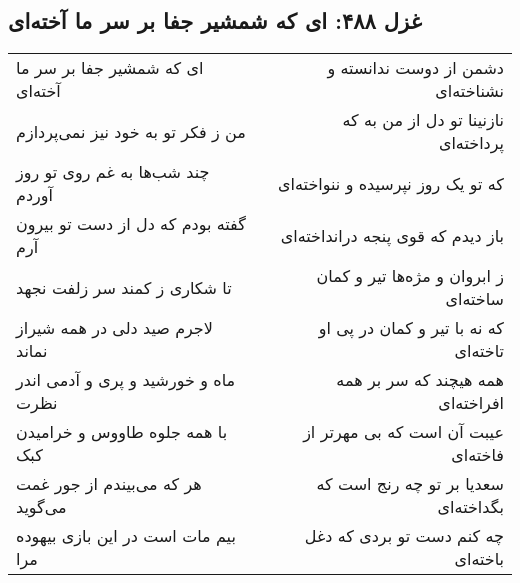 \begin{center}
\section*{غزل ۴۸۸: ای که شمشیر جفا بر سر ما آخته‌ای}
\label{sec:488}
\begin{longtable}{l p{0.5cm} r}
ای که شمشیر جفا بر سر ما آخته‌ای
&&
دشمن از دوست ندانسته و نشناخته‌ای
\\
من ز فکر تو به خود نیز نمی‌پردازم
&&
نازنینا تو دل از من به که پرداخته‌ای
\\
چند شب‌ها به غم روی تو روز آوردم
&&
که تو یک روز نپرسیده و ننواخته‌ای
\\
گفته بودم که دل از دست تو بیرون آرم
&&
باز دیدم که قوی پنجه درانداخته‌ای
\\
تا شکاری ز کمند سر زلفت نجهد
&&
ز ابروان و مژه‌ها تیر و کمان ساخته‌ای
\\
لاجرم صید دلی در همه شیراز نماند
&&
که نه با تیر و کمان در پی او تاخته‌ای
\\
ماه و خورشید و پری و آدمی اندر نظرت
&&
همه هیچند که سر بر همه افراخته‌ای
\\
با همه جلوه طاووس و خرامیدن کبک
&&
عیبت آن است که بی مهرتر از فاخته‌ای
\\
هر که می‌بیندم از جور غمت می‌گوید
&&
سعدیا بر تو چه رنج است که بگداخته‌ای
\\
بیم مات است در این بازی بیهوده مرا
&&
چه کنم دست تو بردی که دغل باخته‌ای
\\
\end{longtable}
\end{center}

